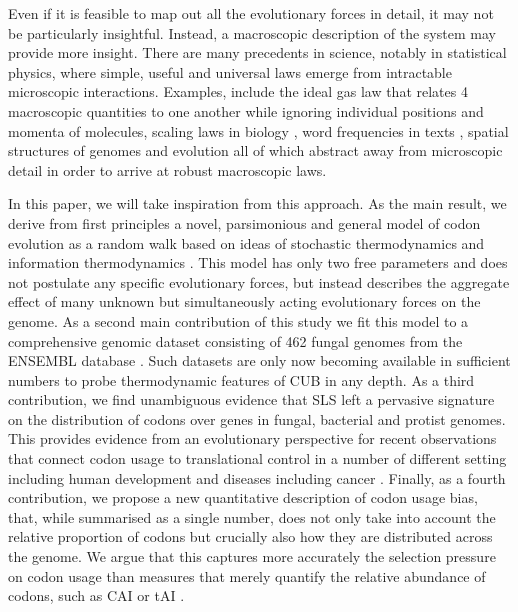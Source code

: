 \documentclass[a4paper,10pt]{paper}%
\begin{document}
\par
Even if it is feasible to map out all the evolutionary  forces in detail, it may not be particularly insightful. Instead, a macroscopic  description of the system may provide more insight. There are many precedents in science, notably in statistical physics, where simple, useful  and  universal laws emerge from intractable microscopic interactions. Examples, include  the ideal gas law that relates 4 macroscopic quantities  to one another while ignoring individual positions and momenta of molecules,   scaling laws in biology \cite{gwest}, word frequencies in texts \cite{zipf}, spatial structures of genomes \cite{fantomas21} and evolution \cite{baksneppen,baksneoppen2} all of which abstract away from microscopic detail in order to arrive at robust macroscopic laws.
\par%
In this paper, we will take inspiration from this approach. As the main result, we  derive from first principles  a novel, parsimonious  and general model of codon evolution as a random walk based   on ideas of stochastic thermodynamics\cite{stochtherm}  and information thermodynamics \cite{infothermreview}. This model has only two free parameters and  does not postulate any specific evolutionary forces, but instead  describes the aggregate effect of many unknown but simultaneously acting  evolutionary forces  on the genome.  As a  second main contribution of this  study  we  fit  this model to a  comprehensive genomic dataset consisting of 462 fungal genomes from the ENSEMBL database \cite{together}. Such datasets are only now becoming available in sufficient numbers to probe thermodynamic features of CUB in any depth.   As a third contribution,  we find  unambiguous evidence that  SLS left  a  pervasive signature on  the distribution of codons over genes in fungal, bacterial and protist genomes. This provides evidence from an evolutionary perspective for recent observations that connect codon usage to translational control in a number of different setting including human development and diseases including cancer \cite{fantomas22}.   Finally, as a fourth contribution, we propose a new quantitative description of codon usage bias, that, while summarised as a single number,  does not only take into account the relative proportion of codons but crucially also how they are distributed across the genome. We argue that this captures more accurately the selection pressure on codon usage than  measures that merely quantify the relative abundance of codons, such as CAI \cite{cai} or tAI \cite{tai}. 
\end{document}

